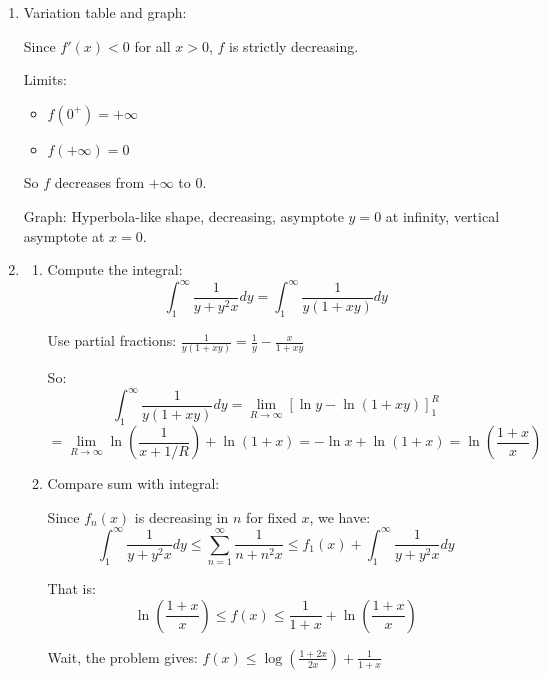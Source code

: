 \documentclass[12pt]{article}
\begin{document}
\begin{answerbox}
\begin{enumerate}
    Since $\sum \frac{1}{n^2 \delta^2}$ converges, $\sum f_n'$ converges uniformly on $[\delta, \infty)$. Therefore $f$ is $C^1$ on $(0, \infty)$ and:
    \[
    f'(x) = \sum_{n=1}^\infty f_n'(x) = -\sum_{n=1}^\infty \frac{1}{(1+nx)^2}
    \]
    
    \item Variation table and graph:
    
    Since $f'(x) < 0$ for all $x > 0$, $f$ is strictly decreasing.
    
    Limits:
    \begin{itemize}
        \item $f(0^+) = +\infty$
        \item $f(+\infty) = 0$
    \end{itemize}
    
    So $f$ decreases from $+\infty$ to $0$.
    
    Graph: Hyperbola-like shape, decreasing, asymptote $y=0$ at infinity, vertical asymptote at $x=0$.
    
    \item 
    \begin{enumerate}
        \item Compute the integral:
        \[
        \int_1^\infty \frac{1}{y + y^2 x} dy = \int_1^\infty \frac{1}{y(1+xy)} dy
        \]
        
        Use partial fractions: $\frac{1}{y(1+xy)} = \frac{1}{y} - \frac{x}{1+xy}$
        
        So:
        \[
        \int_1^\infty \frac{1}{y(1+xy)} dy = \lim_{R\to\infty} \left[ \ln y - \ln(1+xy) \right]_1^R
        \]
        \[
        = \lim_{R\to\infty} \ln\left(\frac{1}{x+1/R}\right) + \ln(1+x) = -\ln x + \ln(1+x) = \ln\left(\frac{1+x}{x}\right)
        \]
        
        \item Compare sum with integral:
        
        Since $f_n(x)$ is decreasing in $n$ for fixed $x$, we have:
        \[
        \int_1^\infty \frac{1}{y + y^2 x} dy \leq \sum_{n=1}^\infty \frac{1}{n + n^2 x} \leq f_1(x) + \int_1^\infty \frac{1}{y + y^2 x} dy
        \]
        
        That is:
        \[
        \ln\left(\frac{1+x}{x}\right) \leq f(x) \leq \frac{1}{1+x} + \ln\left(\frac{1+x}{x}\right)
        \]
        
        Wait, the problem gives: $f(x) \leq \log\left(\frac{1+2x}{2x}\right) + \frac{1}{1+x}$
        

\end{enumerate}
\end{enumerate}
\end{answerbox}
\end{document}

